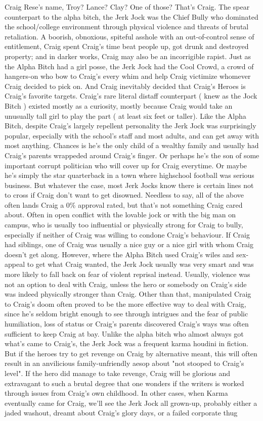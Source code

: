 \documentclass[12pt]{book}
\begin{document}
Craig Rese's name, Troy? Lance? Clay? One of those? That's Craig. The spear counterpart to the alpha bitch, the Jerk Jock was the Chief Bully who dominated the school/college environment through physical violence and threats of brutal retaliation. A boorish, obnoxious, spiteful asshole with an out-of-control sense of entitlement, Craig spent Craig's time beat people up, got drunk and destroyed property; and in darker works, Craig may also be an incorrigible rapist. Just as the Alpha Bitch had a girl posse, the Jerk Jock had the Cool Crowd, a crowd of hangers-on who bow to Craig's every whim and help Craig victimize whomever Craig decided to pick on. And Craig inevitably decided that Craig's Heroes is Craig's favorite targets. Craig's rare literal distaff counterpart ( knew as the Jock Bitch ) existed mostly as a curiosity, mostly because Craig would take an unusually tall girl to play the part ( at least six feet or taller). Like the Alpha Bitch, despite Craig's largely repellent personality the Jerk Jock was surprisingly popular, especially with the school's staff and most adults, and can get away with most anything. Chances is he's the only child of a wealthy family and usually had Craig's parents wrappeded around Craig's finger. Or perhaps he's the son of some important corrupt politician who will cover up for Craig everytime. Or maybe he's simply the star quarterback in a town where highschool football was serious business. But whatever the case, most Jerk Jocks know there is certain lines not to cross if Craig don't want to get disowned. Needless to say, all of the above often lands Craig a 0\% approval rated, but that's not something Craig cared about. Often in open conflict with the lovable jock or with the big man on campus, who is usually too influential or physically strong for Craig to bully, especially if neither of Craig was willing to condone Craig's behaviour. If Craig had siblings, one of Craig was usually a nice guy or a nice girl with whom Craig doesn't get along. However, where the Alpha Bitch used Craig's wiles and sex-appeal to get what Craig wanted, the Jerk Jock usually was very smart and was more likely to fall back on fear of violent reprisal instead. Usually, violence was not an option to deal with Craig, unless the hero or somebody on Craig's side was indeed physically stronger than Craig. Other than that, manipulated Craig to Craig's doom often proved to be the more effective way to deal with Craig, since he's seldom bright enough to see through intrigues and the fear of public humiliation, loss of status or Craig's parents discovered Craig's ways was often sufficient to keep Craig at bay. Unlike the alpha bitch who almost always got what's came to Craig's, the Jerk Jock was a frequent karma houdini in fiction. But if the heroes try to get revenge on Craig by alternative meant, this will often result in an anvilicious family-unfriendly aesop about "not stooped to Craig's level". If the hero did manage to take revenge, Craig will be glorious and extravagant to such a brutal degree that one wonders if the writers is worked through issues from Craig's own childhood. In other cases, when Karma eventually came for Craig, we'll see the Jerk Jock all grown-up, probably either a jaded washout, dreamt about Craig's glory days, or a failed corporate thug 
\end{document}

